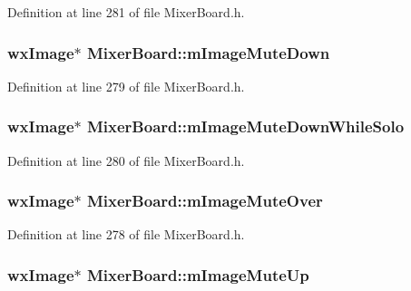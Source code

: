 Definition at line 281 of file Mixer\+Board.\+h.

\subsubsection[{\texorpdfstring{m\+Image\+Mute\+Down}{mImageMuteDown}}]{\setlength{\rightskip}{0pt plus 5cm}wx\+Image$\ast$ Mixer\+Board\+::m\+Image\+Mute\+Down}\hypertarget{class_mixer_board_a31a6143bd347f138733dcf7db3d91917}{}\label{class_mixer_board_a31a6143bd347f138733dcf7db3d91917}


Definition at line 279 of file Mixer\+Board.\+h.

\subsubsection[{\texorpdfstring{m\+Image\+Mute\+Down\+While\+Solo}{mImageMuteDownWhileSolo}}]{\setlength{\rightskip}{0pt plus 5cm}wx\+Image$\ast$ Mixer\+Board\+::m\+Image\+Mute\+Down\+While\+Solo}\hypertarget{class_mixer_board_af3d103e4d95ef249d45bb016ddb5de5e}{}\label{class_mixer_board_af3d103e4d95ef249d45bb016ddb5de5e}


Definition at line 280 of file Mixer\+Board.\+h.

\subsubsection[{\texorpdfstring{m\+Image\+Mute\+Over}{mImageMuteOver}}]{\setlength{\rightskip}{0pt plus 5cm}wx\+Image$\ast$ Mixer\+Board\+::m\+Image\+Mute\+Over}\hypertarget{class_mixer_board_aecc55e89e36d2726b3c9d1cfa78f2139}{}\label{class_mixer_board_aecc55e89e36d2726b3c9d1cfa78f2139}


Definition at line 278 of file Mixer\+Board.\+h.

\subsubsection[{\texorpdfstring{m\+Image\+Mute\+Up}{mImageMuteUp}}]{\setlength{\rightskip}{0pt plus 5cm}wx\+Image$\ast$ Mixer\+Board\+::m\+Image\+Mute\+Up}\hypertarget{class_mixer_board_adf9eeecd5446a5fa241ae202883f0261}{}\label{class_mixer_board_adf9eeecd5446a5fa241ae202883f0261}


